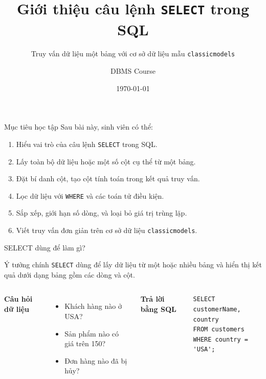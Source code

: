 \documentclass[aspectratio=169,11pt]{beamer}
\title[SQL SELECT]{Giới thiệu câu lệnh \texttt{SELECT} trong SQL}
\subtitle{Truy vấn dữ liệu một bảng với cơ sở dữ liệu mẫu \texttt{classicmodels}}
\author{DBMS Course}
\institute{Smart Logistics and Supply Chain Management Lab}
\date{\today}
\newcommand{\kw}[1]{\textcolor{sqlblue}{\texttt{#1}}}
\newcommand{\minihead}[1]{\vspace{2pt}\textbf{#1}\vspace{2pt}}
\begin{document}
\begin{frame}
  \titlepage
\end{frame}

\begin{frame}{Mục tiêu học tập}
Sau bài này, sinh viên có thể:
\begin{enumerate}
  \item Hiểu vai trò của câu lệnh \kw{SELECT} trong SQL.
  \item Lấy toàn bộ dữ liệu hoặc một số cột cụ thể từ một bảng.
  \item Đặt bí danh cột, tạo cột tính toán trong kết quả truy vấn.
  \item Lọc dữ liệu với \kw{WHERE} và các toán tử điều kiện.
  \item Sắp xếp, giới hạn số dòng, và loại bỏ giá trị trùng lặp.
  \item Viết truy vấn đơn giản trên cơ sở dữ liệu \texttt{classicmodels}.
\end{enumerate}
\end{frame}

\begin{frame}[fragile]{SELECT dùng để làm gì?}
\begin{block}{Ý tưởng chính}
\kw{SELECT} dùng để lấy dữ liệu từ một hoặc nhiều bảng và hiển thị kết quả dưới dạng bảng gồm các dòng và cột.
\end{block}
\begin{columns}[T]
\minihead{Câu hỏi dữ liệu}
\begin{itemize}
  \item Khách hàng nào ở USA?
  \item Sản phẩm nào có giá trên 150?
  \item Đơn hàng nào đã bị hủy?
\end{itemize}
\minihead{Trả lời bằng SQL}
\begin{lstlisting}
SELECT customerName, country
FROM customers
WHERE country = 'USA';
\end{lstlisting}
\end{columns}
\end{frame}
\end{document}
